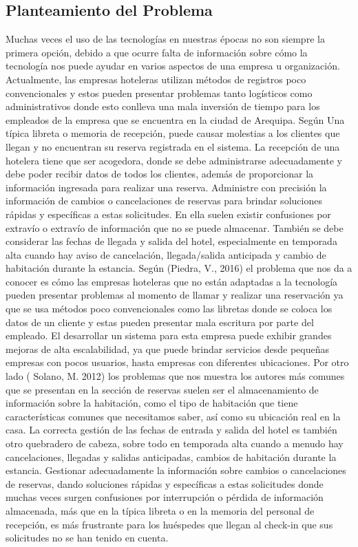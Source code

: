 \documentclass[12pt,a4paper,oneside]{article}
\begin{document}
\subsection{Planteamiento del Problema}
Muchas veces el uso de las tecnologías en nuestras épocas no son siempre la primera opción, debido a que ocurre falta de información sobre cómo la tecnología nos puede ayudar en varios aspectos de una empresa u organización. Actualmente, las empresas hoteleras utilizan métodos de registros poco convencionales y estos pueden presentar problemas tanto logísticos como administrativos donde esto conlleva una mala inversión de tiempo para los empleados de la empresa que se encuentra en la ciudad de Arequipa.   
Según \cite{Por2017} Una típica libreta o memoria de recepción, puede causar molestias a los clientes que llegan y no encuentran su reserva registrada en el sistema. La recepción de una hotelera tiene que ser acogedora, donde se debe administrarse adecuadamente y debe poder recibir datos de todos los clientes, además de proporcionar la información ingresada para realizar una reserva. Administre con precisión la información de cambios o cancelaciones de reservas para brindar soluciones rápidas y específicas a estas solicitudes. En ella suelen existir confusiones por extravío o extravío de información que no se puede almacenar. También se debe considerar las fechas de llegada y salida del hotel, especialmente en temporada alta cuando hay aviso de cancelación, llegada/salida anticipada y cambio de habitación durante la estancia. Según (Piedra, V., 2016) el problema que nos da a conocer es cómo las empresas hoteleras que no están adaptadas a la tecnología pueden presentar problemas al momento de llamar y realizar una reservación ya que se usa métodos poco convencionales como las libretas donde se coloca los datos de un cliente y estas pueden presentar mala escritura por parte del empleado. El desarrollar un sistema para esta empresa puede exhibir grandes mejoras de alta escalabilidad, ya que puede brindar servicios desde pequeñas empresas con pocos usuarios, hasta empresas con diferentes ubicaciones.  
Por otro lado (	Solano, M. 2012) los problemas que nos muestra los autores más comunes que se presentan en la sección de reservas suelen ser el almacenamiento de información sobre la habitación, como el tipo de habitación que tiene características comunes que necesitamos saber, así como su ubicación real en la casa. La correcta gestión de las fechas de entrada y salida del hotel es también otro quebradero de cabeza, sobre todo en temporada alta cuando a menudo hay cancelaciones, llegadas y salidas anticipadas, cambios de habitación durante la estancia. Gestionar adecuadamente la información sobre cambios o cancelaciones de reservas, dando soluciones rápidas y específicas a estas solicitudes donde muchas veces surgen confusiones por interrupción o pérdida de información almacenada, más que en la típica libreta o en la memoria del personal de recepción, es más frustrante para los huéspedes que llegan al check-in que sus solicitudes no se han tenido en cuenta.
\end{document}
